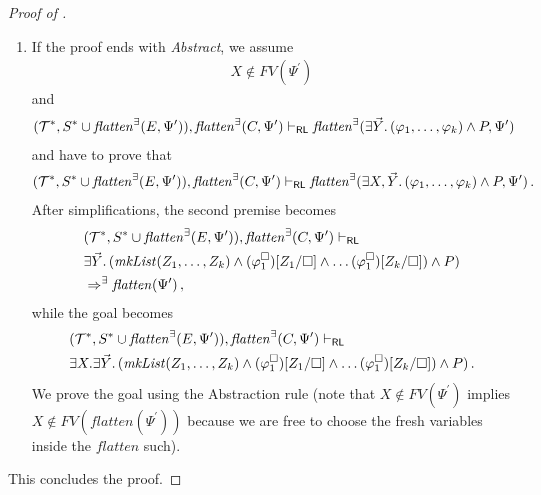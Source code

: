 \begin{proof}[Proof of ]
\begin{enumerate}
        
    \item If the proof ends with \emph{Abstract},
    we assume
    \begin{align*}
        X \not\in \mathit{FV}(\Psi^\prime)
    \end{align*}
    and
    \begin{align*}
                (\mathcal{T}^*, S^* \cup \mathit{flatten}^\exists(E, \Psi^\prime)), \mathit{flatten}^\exists(C, \Psi^\prime) \vdash_{\mathsf{RL}}
          \mathit{flatten}^\exists(\exists \vec{Y}.\, (\varphi_1, \ldots, \varphi_k) \land P, \Psi^\prime)
    \end{align*}
    and have to prove that
    \begin{align*}
                (\mathcal{T}^*, S^* \cup \mathit{flatten}^\exists(E, \Psi^\prime)), \mathit{flatten}^\exists(C, \Psi^\prime) \vdash_{\mathsf{RL}}
          \mathit{flatten}^\exists(\exists X,\vec{Y}.\, (\varphi_1, \ldots, \varphi_k) \land P, \Psi^\prime) \, .
    \end{align*}
    After simplifications, the second premise becomes
    \begin{align*}
            &(\mathcal{T}^*, S^* \cup \mathit{flatten}^\exists(E, \Psi^\prime)), \mathit{flatten}^\exists(C, \Psi^\prime) \vdash_{\mathsf{RL}}
          \\& \exists \vec{Y}.\, (\mathit{mkList}(Z_1, \ldots, Z_k) \land (\varphi_1^\square)[Z_1/\square] \land \ldots (\varphi_1^\square)[Z_k/\square]) \land P)
          \\&
          \Rightarrow^\exists \mathit{flatten}(\Psi^\prime) \, ,
    \end{align*}
    while the goal becomes
    \begin{align*}
          &(\mathcal{T}^*, S^* \cup \mathit{flatten}^\exists(E, \Psi^\prime)), \mathit{flatten}^\exists(C, \Psi^\prime) \vdash_{\mathsf{RL}}
          \\&\exists X. \exists \vec{Y}.\, (\mathit{mkList}(Z_1, \ldots, Z_k) \land (\varphi_1^\square)[Z_1/\square] \land \ldots (\varphi_1^\square)[Z_k/\square]) \land P) \, .
    \end{align*}
    We prove the goal using the Abstraction rule
    (note that $X \not\in \mathit{FV}(\Psi^\prime)$ implies $X \not\in \mathit{FV}(\mathit{flatten}(\Psi^\prime))$
    because we are free to choose the fresh variables inside the $\mathit{flatten}$ such).
    \end{enumerate}
    This concludes the proof.
\end{proof}


